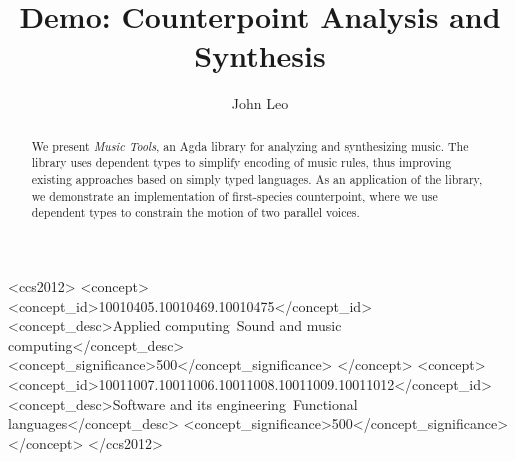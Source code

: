 \documentclass[sigplan,screen]{acmart}
\begin{document}
\title{Demo: Counterpoint Analysis and Synthesis}


\author{John Leo}


\begin{abstract}
We present \emph{Music Tools}, an Agda library for analyzing 
and synthesizing music.  
The library uses dependent types to simplify encoding of 
music rules, thus improving existing approaches based on 
simply typed languages.  
As an application of the library, we demonstrate an 
implementation of first-species counterpoint, where we use
dependent types to constrain the motion of two parallel
voices.
\end{abstract}


\begin{CCSXML}
<ccs2012>
<concept>
<concept_id>10010405.10010469.10010475</concept_id>
<concept_desc>Applied computing~Sound and music computing</concept_desc>
<concept_significance>500</concept_significance>
</concept>
<concept>
<concept_id>10011007.10011006.10011008.10011009.10011012</concept_id>
<concept_desc>Software and its engineering~Functional languages</concept_desc>
<concept_significance>500</concept_significance>
</concept>
</ccs2012>
\end{CCSXML}




\maketitle
\end{document}
